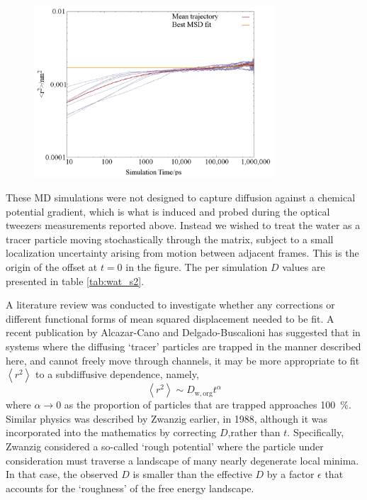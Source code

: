 \begin{figure}
    \centering
    \includegraphics[width=0.8\textwidth]{chapters/water_hopping/figures/Fig_S7.png}
    \label{fig:wat_s7}
\end{figure}

These MD simulations were not designed to capture diffusion against a chemical potential gradient, which is what is induced and probed during the optical tweezers measurements reported above. Instead we wished to treat the water as a tracer particle moving stochastically through the matrix, subject to a small localization uncertainty arising from motion between adjacent frames\cite{michaletMeanSquareDisplacement2010}. This is the origin of the offset at $t=0$ in the figure. The per simulation $D$ values are presented in table \ref{tab:wat_s2}. 

A literature review was conducted to investigate whether any corrections or different functional forms of mean squared displacement needed to be fit. A recent publication\cite{alcazar-canoGeneralPhenomenologicalRelation2018} by Alcazar-Cano and Delgado-Buscalioni has suggested that in systems where the diffusing `tracer’ particles are trapped in the manner described here, and cannot freely move through channels, it may be more appropriate to fit $\left\langle r^{2}\right\rangle$ to a subdiffusive dependence, namely, 
\begin{equation}
\left\langle r^{2}\right\rangle \sim D_{\mathrm{w, org}} t^{\alpha}
\end{equation}
where $\alpha \rightarrow 0$ as the proportion of particles that are trapped approaches \SI{100}{\percent}. Similar physics was described by Zwanzig\cite{zwanzigDiffusionRoughPotential1988} earlier, in 1988, although it was incorporated into the mathematics by correcting $D$,rather than $t$. Specifically, Zwanzig considered a so-called `rough potential' where the particle under consideration must traverse a landscape of many nearly degenerate local minima. In that case, the observed $D$ is smaller than the effective $D$ by a factor $\epsilon$ that accounts for the `roughness' of the free energy landscape.

